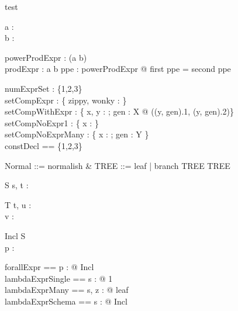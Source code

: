 \begin{zsection}
 \SECTION test
\end{zsection}

\begin{axdef}
  a : \power \nat\\
  b : \power \nat
\end{axdef}

\begin{axdef}
  powerProdExpr : \power (a \cross b)\\
  prodExpr : a \cross b
\where
  \forall ppe : powerProdExpr @ first ppe = second ppe
\end{axdef}

\begin{gendef}[X, Y]
  numExprSet : \{1,2,3\}\\
  setCompExpr : \power \{ zippy, wonky : \nat \}\\
  setCompWithExpr : \{ x, y : \nat ; gen : X @ ((y, gen).1, (y, gen).2)\}\\
  setCompNoExpr1 : \{ x : \nat \}\\
  setCompNoExprMany : \{ x : \nat; gen : Y \}\\
  constDecl == \{1,2,3\}
\end{gendef}

\begin{zed}
  Normal ::= normalish \ldata \nat \rdata &
  TREE ::= leaf | branch \ldata \nat \cross TREE \cross TREE \rdata
\end{zed}

\begin{schema}{S}
  s, t : \nat
\end{schema}

\begin{schema}{T}
  t, u : \nat\\
  v : \power \nat
\end{schema}

\begin{schema}{Incl}
  S\\
  p : \nat
\end{schema}

\begin{zed}
  forallExpr == \forall p : \nat @ Incl\\
  lambdaExprSingle == \lambda s : \nat @ 1\\
  lambdaExprMany == \lambda s, z : \nat @ leaf\\
  lambdaExprSchema == \lambda s : \nat @ Incl\\
\end{zed}

